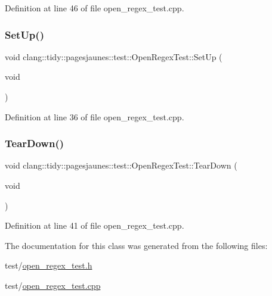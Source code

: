 Definition at line 46 of file open\+\_\+regex\+\_\+test.\+cpp.

\mbox{\label{classclang_1_1tidy_1_1pagesjaunes_1_1test_1_1_open_regex_test_a6e06a613fbaaa3b8bc6e7e3c687c53ab}} 
\subsubsection{\texorpdfstring{Set\+Up()}{SetUp()}}
{\footnotesize\ttfamily void clang\+::tidy\+::pagesjaunes\+::test\+::\+Open\+Regex\+Test\+::\+Set\+Up (\begin{DoxyParamCaption}\item[{void}]{ }\end{DoxyParamCaption})\hspace{0.3cm}{\ttfamily [virtual]}}



Definition at line 36 of file open\+\_\+regex\+\_\+test.\+cpp.

\mbox{\label{classclang_1_1tidy_1_1pagesjaunes_1_1test_1_1_open_regex_test_a82384f4696f9f714c55a3ef10a4ac506}} 
\subsubsection{\texorpdfstring{Tear\+Down()}{TearDown()}}
{\footnotesize\ttfamily void clang\+::tidy\+::pagesjaunes\+::test\+::\+Open\+Regex\+Test\+::\+Tear\+Down (\begin{DoxyParamCaption}\item[{void}]{ }\end{DoxyParamCaption})\hspace{0.3cm}{\ttfamily [virtual]}}



Definition at line 41 of file open\+\_\+regex\+\_\+test.\+cpp.



The documentation for this class was generated from the following files\+:\begin{DoxyCompactItemize}
\item 
test/\hyperlink{open__regex__test_8h}{open\+\_\+regex\+\_\+test.\+h}\item 
test/\hyperlink{open__regex__test_8cpp}{open\+\_\+regex\+\_\+test.\+cpp}\end{DoxyCompactItemize}
